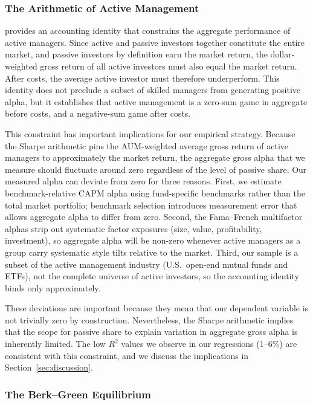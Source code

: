 \documentclass[11pt, a4paper]{article}
\begin{document}
\subsubsection{The Arithmetic of Active Management}
\label{subsub:sharpe_arithmetic}

\textcite{sharpe1991} provides an accounting identity that constrains the aggregate performance of active managers. Since active and passive investors together constitute the entire market, and passive investors by definition earn the market return, the dollar-weighted gross return of all active investors must also equal the market return. After costs, the average active investor must therefore underperform. This identity does not preclude a subset of skilled managers from generating positive alpha, but it establishes that active management is a zero-sum game in aggregate before costs, and a negative-sum game after costs.

This constraint has important implications for our empirical strategy. Because the Sharpe arithmetic pins the AUM-weighted average gross return of active managers to approximately the market return, the aggregate gross alpha that we measure should fluctuate around zero regardless of the level of passive share. Our measured alpha can deviate from zero for three reasons. First, we estimate benchmark-relative CAPM alpha using fund-specific benchmarks rather than the total market portfolio; benchmark selection introduces measurement error that allows aggregate alpha to differ from zero. Second, the Fama--French multifactor alphas strip out systematic factor exposures (size, value, profitability, investment), so aggregate alpha will be non-zero whenever active managers as a group carry systematic style tilts relative to the market. Third, our sample is a subset of the active management industry (U.S.\ open-end mutual funds and ETFs), not the complete universe of active investors, so the accounting identity binds only approximately.

These deviations are important because they mean that our dependent variable is not trivially zero by construction. Nevertheless, the Sharpe arithmetic implies that the scope for passive share to explain variation in aggregate gross alpha is inherently limited. The low $R^2$ values we observe in our regressions (1--6\%) are consistent with this constraint, and we discuss the implications in Section~\ref{sec:discussion}.

\subsubsection{The Berk--Green Equilibrium}
\label{subsub:berk_green}
\end{document}
